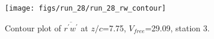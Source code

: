 \begin{figure}[H]
\centering
\texttt{[image: figs/run\_28/run\_28\_rw\_contour]}
\caption{Contour plot of $\overline{r^\prime w^\prime}$ at $z/c$=7.75, $V_{free}$=29.09, station 3.}
\label{fig:run_28_rw_contour}
\end{figure}


